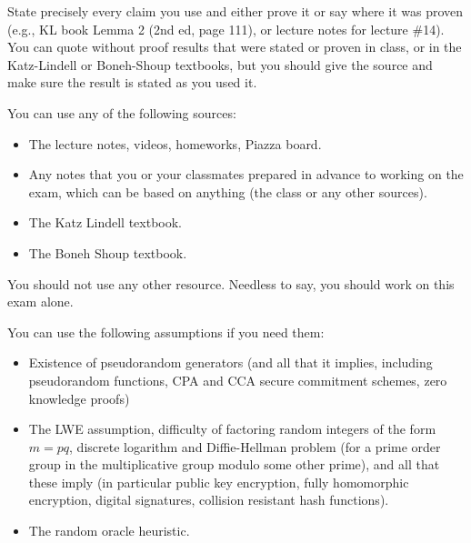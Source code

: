 \documentclass{article}
\begin{document}
State precisely every claim you use and either prove it or say where it was proven (e.g., KL book Lemma 2 (2nd ed, page 111), or lecture notes for lecture \#14).
You can quote without proof results that were stated or proven in class, or in the Katz-Lindell or Boneh-Shoup textbooks, but you should give the source and make sure the result is stated as you used it.%

You can use any of the following sources:%

\begin{itemize}[noitemsep,topsep=\mdcompacttopsep]%

\item{}The lecture notes, videos, homeworks, Piazza board.%

\item{}Any notes that you or your classmates prepared in advance to working on the exam, which can be based on anything (the class or any other sources).%

\item{}The Katz Lindell textbook.%

\item{}The Boneh Shoup textbook.%
\end{itemize}%

\noindent{}You should not use any other resource. Needless to say, you should work on this exam alone.%

You can use the following assumptions if you need them:%

\begin{itemize}%

\item{}
Existence of pseudorandom generators (and all that it implies, including pseudorandom functions,  CPA and CCA secure commitment schemes, zero knowledge proofs)%

\item{}
The LWE assumption, difficulty of  factoring random integers of the form $m=pq$, discrete logarithm and Diffie-Hellman problem (for a prime order group in the multiplicative group modulo some other prime), and all that these imply (in particular public key encryption, fully homomorphic encryption, digital signatures, collision resistant hash functions).%

\item{}
The random oracle heuristic.%
\end{itemize}%
\end{document}
